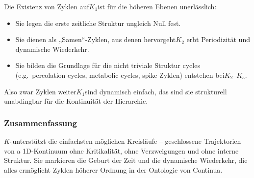 Die Existenz von Zyklen auf$K_1$ist für die höheren Ebenen unerlässlich:

\begin{itemize}
  \item Sie legen die erste zeitliche Struktur ungleich Null fest.
  \item Sie dienen als „Samen“-Zyklen, aus denen hervorgeht$K_2$
erbt Periodizität und dynamische Wiederkehr.
  \item Sie bilden die Grundlage für die nicht triviale Struktur
        cycles (e.g.\ percolation cycles, metabolic cycles, spike
Zyklen) entstehen bei$K_2$–$K_5$.
\end{itemize}

Also zwar Zyklen weiter$K_1$sind dynamisch einfach, das sind sie
strukturell unabdingbar für die Kontinuität der Hierarchie.

\subsubsection{Zusammenfassung}

$K_1$unterstützt die einfachsten möglichen Kreisläufe – geschlossene Trajektorien von a
1D-Kontinuum ohne Kritikalität, ohne Verzweigungen und ohne interne
Struktur.
Sie markieren die Geburt der Zeit und die dynamische Wiederkehr, die alles ermöglicht
Zyklen höherer Ordnung in der Ontologie von Continua.
